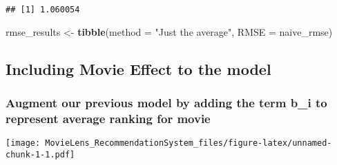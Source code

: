 \documentclass[
]{article}
\newenvironment{Shaded}{\begin{snugshade}}{\end{snugshade}}
\newcommand{\DataTypeTok}[1]{\textcolor[rgb]{0.13,0.29,0.53}{#1}}
\newcommand{\DecValTok}[1]{\textcolor[rgb]{0.00,0.00,0.81}{#1}}
\newcommand{\KeywordTok}[1]{\textcolor[rgb]{0.13,0.29,0.53}{\textbf{#1}}}
\newcommand{\NormalTok}[1]{#1}
\newcommand{\OperatorTok}[1]{\textcolor[rgb]{0.81,0.36,0.00}{\textbf{#1}}}
\newcommand{\StringTok}[1]{\textcolor[rgb]{0.31,0.60,0.02}{#1}}
\begin{document}
\begin{verbatim}
## [1] 1.060054
\end{verbatim}

\begin{Shaded}
\begin{Highlighting}[]
\NormalTok{rmse_results <-}\StringTok{ }\KeywordTok{tibble}\NormalTok{(}\DataTypeTok{method =} \StringTok{"Just the average"}\NormalTok{, }\DataTypeTok{RMSE =}\NormalTok{ naive_rmse)}
\end{Highlighting}
\end{Shaded}

\hypertarget{including-movie-effect-to-the-model}{%
\subsection{Including Movie Effect to the
model}\label{including-movie-effect-to-the-model}}

\hypertarget{augment-our-previous-model-by-adding-the-term-b_i-to-represent-average-ranking-for-movie}{%
\subsubsection{Augment our previous model by adding the term b\_i to
represent average ranking for
movie}\label{augment-our-previous-model-by-adding-the-term-b_i-to-represent-average-ranking-for-movie}}

\begin{Shaded}
\end{Shaded}

\texttt{[image: MovieLens\_RecommendationSystem\_files/figure-latex/unnamed-chunk-1-1.pdf]}

\begin{Shaded}
\end{Shaded}
\end{document}
